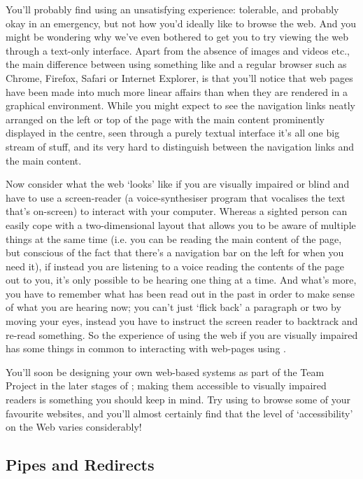 You'll probably find using  an unsatisfying experience: tolerable, and probably okay in an emergency, but not how you'd ideally like to browse the web. And you might be wondering why we've even bothered to get you to try viewing the web through a text-only interface. Apart from the absence of images and videos etc., the main difference between using something like  and a regular browser such as Chrome, Firefox, Safari or Internet Explorer, is that you'll notice that web pages have been made into much more linear affairs than when they are rendered in a graphical environment. While you might expect to see the navigation links neatly arranged on the left or top of the page with the main content prominently displayed in the centre, seen through a purely textual interface it's all one big stream of stuff, and its very hard to distinguish between the navigation links and the main content. 

Now consider what the web `looks' like if you are visually impaired or blind and have to use a screen-reader (a voice-synthesiser program that vocalises the text that's on-screen) to interact with your computer. Whereas a sighted person can easily cope with a two-dimensional layout that allows you to be aware of multiple things at the same time (i.e. you can be reading the main content of the page, but conscious of the fact that there's a navigation bar on the left for when you need it), if instead you are listening to a voice reading the contents of the page out to you, it's only possible to be hearing one thing at a time. And what's more, you have to remember what has been read out in the past in order to make sense of what you are hearing now; you can't just `flick back' a paragraph or two by moving your eyes, instead you have to instruct the screen reader to backtrack and re-read something. So the experience of using the web if you are visually impaired has some things in common to interacting with web-pages using . 

You'll soon be designing your own web-based systems as part of the Team Project in the later stages of ; making them accessible to visually impaired readers is something you should keep in mind. Try using  to browse some of your favourite websites, and you'll almost certainly find that the level of `accessibility' on the Web varies considerably!

\subsection{Pipes and Redirects}
\label{section:pipesandredirects}

